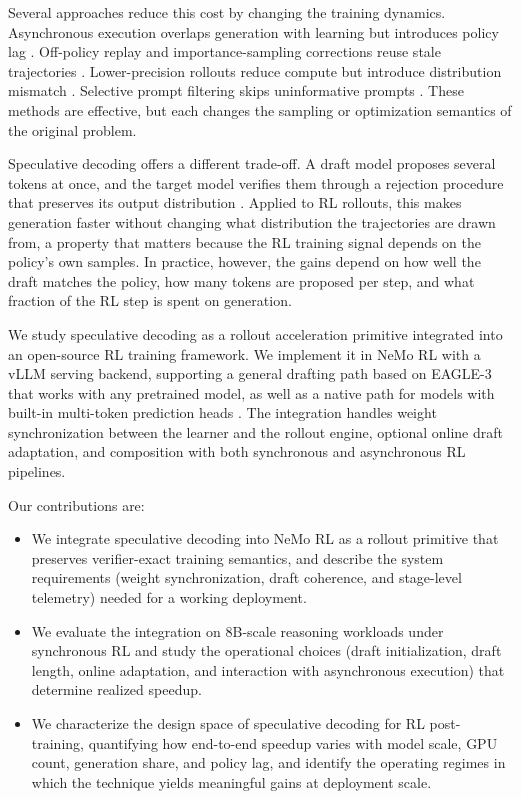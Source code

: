 \documentclass[11pt, logo, onecolumn, copyright, colorlinks=true, allcolors=blue]{nvidiatechreport}
\begin{document}
Several approaches reduce this cost by changing the training dynamics. Asynchronous execution overlaps generation with learning but introduces policy lag \citep{noukhovitch2024async,piche2025pipelinerl,meta2025llamarl}. Off-policy replay and importance-sampling corrections reuse stale trajectories \citep{li2025repo,zheng2025gspo,wang2025aspo,sheng2026espo}. Lower-precision rollouts reduce compute but introduce distribution mismatch \citep{xi2026jetrl,qiu2026fp8rl,li2026qurl}. Selective prompt filtering skips uninformative prompts \citep{zheng2025greso}. These methods are effective, but each changes the sampling or optimization semantics of the original problem.

Speculative decoding offers a different trade-off. A draft model proposes several tokens at once, and the target model verifies them through a rejection procedure that preserves its output distribution \citep{leviathan2023fast,chen2023speculative,cai2024medusa,li2024eagle,mtp2024}. Applied to RL rollouts, this makes generation faster without changing what distribution the trajectories are drawn from, a property that matters because the RL training signal depends on the policy's own samples. In practice, however, the gains depend on how well the draft matches the policy, how many tokens are proposed per step, and what fraction of the RL step is spent on generation.

We study speculative decoding as a rollout acceleration primitive integrated into an open-source RL training framework. We implement it in NeMo RL with a vLLM serving backend, supporting a general drafting path based on EAGLE-3 \citep{li2024eagle,li2025eagle3} that works with any pretrained model, as well as a native path for models with built-in multi-token prediction heads \citep{mtp2024}. The integration handles weight synchronization between the learner and the rollout engine, optional online draft adaptation, and composition with both synchronous and asynchronous RL pipelines.

Our contributions are:
\begin{itemize}
\item We integrate speculative decoding into NeMo RL as a rollout primitive that preserves verifier-exact training semantics, and describe the system requirements (weight synchronization, draft coherence, and stage-level telemetry) needed for a working deployment.
\item We evaluate the integration on 8B-scale reasoning workloads under synchronous RL and study the operational choices (draft initialization, draft length, online adaptation, and interaction with asynchronous execution) that determine realized speedup.
\item We characterize the design space of speculative decoding for RL post-training, quantifying how end-to-end speedup varies with model scale, GPU count, generation share, and policy lag, and identify the operating regimes in which the technique yields meaningful gains at deployment scale.
\end{itemize}
\end{document}
